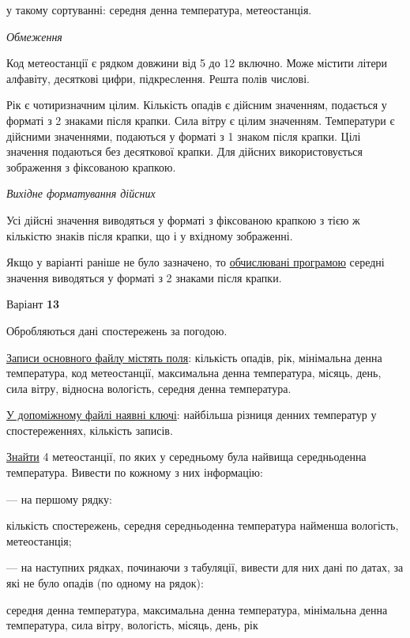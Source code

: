 \documentclass[11pt, ukrainian]{article}
\begin{document}
{\noindent}у такому сортуванні: середня денна температура, метеостанція.


\bigskip\textit{Обмеження}

Код метеостанції є рядком довжини від 5 до 12 включно.
Може містити літери алфавіту, десяткові цифри, підкреслення. Решта полів числові.

Рік є чотиризначним цілим.
Кількість опадів є дійсним значенням, подається у форматі з 2 знаками після крапки.
Сила вітру є цілим значенням.
Температури є дійсними значеннями, подаються у форматі з 1 знаком після крапки.
Цілі значення подаються без десяткової крапки.
Для дійсних використовується зображення з фіксованою крапкою.

\textit{Вихідне форматування дійсних}

Усі дійсні значення виводяться у форматі з фіксованою крапкою з тією ж кількістю знаків після крапки, що і у вхідному зображенні.

Якщо у варіанті раніше не було зазначено, то \underline{обчислювані програмою} середні значення виводяться у форматі з 2 знаками після крапки.


\par
\newpage
{\center Варіант  \No \textbf { 13 }\par}
\bigskip
Обробляються дані спостережень за погодою. 

\underline{Записи основного файлу містять поля}: кількість опадів, рік, мінімальна денна температура, код метеостанції, максимальна денна температура, місяць, день, сила вітру, відносна вологість, середня денна температура.

\underline{У допоміжному файлі наявні ключі}: найбільша різниця денних температур у спостереженнях, кількість записів.

\underline{Знайти} 4 метеостанції, по яких у середньому була найвища середньоденна температура. Вивести по кожному з них інформацію:\par
{\noindent}--- на першому рядку:\par
кількість спостережень, середня середньоденна температура найменша вологість, метеостанція;

{\noindent}--- на наступних рядках, починаючи з табуляції, вивести для них дані по датах, за які не було опадів (по одному на рядок):\par
середня денна температура, максимальна денна температура, мінімальна денна температура, сила вітру, вологість, місяць, день, рік
\end{document}
